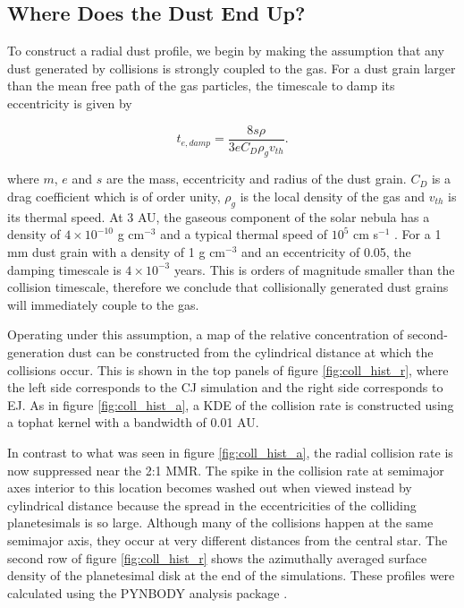 \documentclass[onecolumn]{aastex63}
\begin{document}
\subsection{Where Does the Dust End Up?}

To construct a radial dust profile, we begin by making the assumption that any dust generated by collisions is strongly coupled to the 
gas. For a dust grain larger than the mean free path of the gas particles, the timescale to damp its eccentricity is given by 
\citep{1976PThPh..56.1756A}

\begin{equation}\label{eq:t_edamp}
    t_{e, damp} = \frac{8 s \rho}{3 e C_{D} \rho_{g} v_{th}}.
\end{equation}

where $m$, $e$ and $s$ are the mass, eccentricity and radius of the dust grain. $C_{D}$ is a drag coefficient which is of order unity, $
\rho_{g}$ is the local density of the gas and $v_{th}$ is its thermal speed. At 3 AU, the gaseous component of the solar nebula has a 
density of $4 \times 10^{-10}$ g cm$^{-3}$ and a typical thermal speed of $10^{5}$ cm s$^{-1}$ \citep{1981PThPS..70...35H}. For a 1 
mm dust grain with a density of 1 g cm$^{-3}$ and an eccentricity of 0.05, the damping timescale is $4 \times 10^{-3}$ years. This is 
orders of magnitude smaller than the collision timescale, therefore we conclude that collisionally generated dust grains will immediately 
couple to the gas.

Operating under this assumption, a map of the relative concentration of second-generation dust can be constructed from the cylindrical 
distance at which the collisions occur. This is shown in the top panels of figure \ref{fig:coll_hist_r}, where the left side corresponds to the CJ 
simulation and the right side corresponds to EJ. As in figure \ref{fig:coll_hist_a}, a KDE of the collision rate is constructed using a tophat 
kernel with a bandwidth of 0.01 AU.

In contrast to what was seen in figure \ref{fig:coll_hist_a}, the radial collision rate is now suppressed near the 2:1 MMR. The spike in the 
collision rate at semimajor axes interior to this location becomes washed out when viewed instead by cylindrical distance because the 
spread in the eccentricities of the colliding planetesimals is so large. Although many of the collisions happen at the same semimajor axis, 
they occur at very different distances from the central star. The second row of figure \ref{fig:coll_hist_r} shows the azimuthally averaged 
surface density of the planetesimal disk at the end of the simulations. These profiles were calculated using the {\sc PYNBODY} analysis 
package \citep{2013ascl.soft05002P}.
\end{document}

